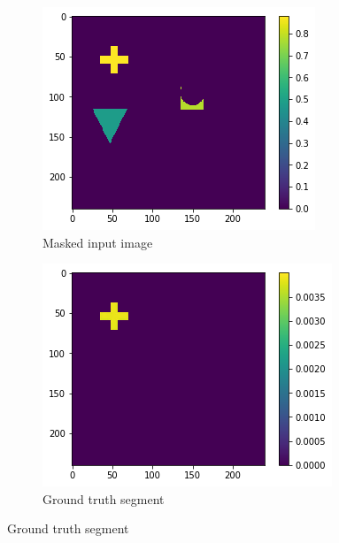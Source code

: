 \begin{figure}[H]
    \centering
    \begin{subfigure}{.33\textwidth}
        \centering
        \includegraphics[width=\linewidth]{chapters/06_hdm/visualization/masked.png}
        \caption{Masked input image}
    \end{subfigure}%
    \begin{subfigure}{.33\textwidth}
        \centering
        \includegraphics[width=\linewidth]{chapters/06_hdm/visualization/ground_truth.png}
        \caption{Ground truth segment}
    \end{subfigure}

\end{figure}
